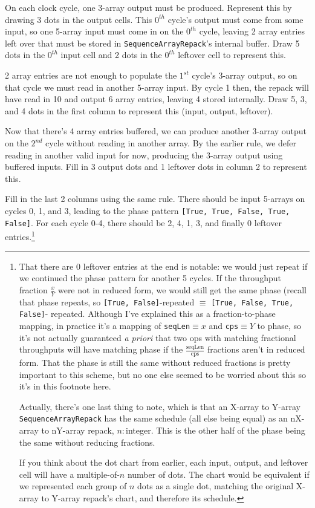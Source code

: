 \documentclass[12pt]{article}
\begin{document}
On each clock cycle, one 3-array output must be produced. Represent
this by drawing 3 dots in the output cells. This $0^{th}$ cycle's
output must come from some input, so one 5-array input must come in
on the $0^{th}$ cycle, leaving 2 array entries left over that must
be stored in \texttt{SequenceArrayRepack}'s internal buffer. Draw
5 dots in the $0^{th}$ input cell and 2 dots in the $0^{th}$
leftover cell to represent this.

2 array entries are not enough to populate the $1^{st}$ cycle's 3-array
output, so on that cycle we must read in another 5-array input. By
cycle 1 then, the repack will have read in 10 and output 6 array entries,
leaving 4 stored internally. Draw 5, 3, and 4 dots in the first column
to represent this (input, output, leftover).

Now that there's 4 array entries buffered, we can produce another
3-array output on the $2^{nd}$ cycle without reading in another array.
By the earlier rule, we defer reading in another valid input for now,
producing the 3-array output using buffered inputs. Fill in 3 output
dots and 1 leftover dots in column 2 to represent this.

Fill in the last 2 columns using the same rule. There should be
input 5-arrays on cycles 0, 1, and 3, leading to the phase pattern
\texttt{[True, True, False, True, False]}. For each cycle 0-4, there
should be 2, 4, 1, 3, and finally 0 leftover entries.\footnote{
That there are 0 leftover entries at the end is notable: we would
just repeat if we continued the phase pattern for another 5 cycles.
If the throughput fraction $\frac{x}{Y}$ were not in reduced form, we
would still get the same phase (recall that phase repeats, so
\texttt{[True, False]}-repeated $\equiv$ \texttt{[True, False, True, False]}-%
repeated. Although I've explained this as a fraction-to-phase mapping,
in practice it's a mapping of \texttt{seqLen}$\equiv x$ and
\texttt{cps}$\equiv Y$ to phase, so it's not actually guaranteed
\textit{a priori} that two ops with matching fractional throughputs
will have matching phase if the $\frac{\text{seqLen}}{\text{cps}}$
fractions aren't in reduced form. That the phase is still the same
without reduced fractions is pretty important to this scheme, but
no one else seemed to be worried about this so it's in this footnote
here.

Actually, there's one last thing to note, which is that an
X-array to Y-array \texttt{SequenceArrayRepack} has the same schedule
(all else being equal) as an nX-array to nY-array repack, $n:$integer.
This is the other half of the phase being the same without reducing
fractions.

If you think about the dot chart from earlier, each input, output,
and leftover cell will have a multiple-of-$n$ number of dots. The
chart would be equivalent if we represented each group of $n$ dots
as a single dot, matching the original X-array to Y-array repack's chart,
and therefore its schedule.}
\end{document}
